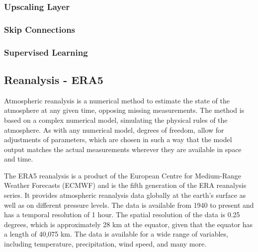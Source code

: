 \subsubsection*{Upscaling Layer}

\subsubsection*{Skip Connections}

\subsubsection*{Supervised Learning}

\subsection{Reanalysis - ERA5}

Atmospheric reanalysis is a numerical method to estimate the state of the atmosphere at any given time, opposing missing measurements. The method is based on a complex numerical model, simulating the physical rules of the atmosphere. As with any numerical model, degrees of freedom, allow for adjustments of parameters, which are chosen in such a way that the model output matches the actual measurements wherever they are available in space and time.

The ERA5 reanalysis is a product of the European Centre for Medium-Range Weather Forecasts (ECMWF) and is the fifth generation of the ERA reanalysis series. It provides atmospheric reanalysis data globally at the earth's surface as well as on different pressure levels. The data is available from 1940 to present and has a temporal resolution of 1 hour. The spatial resolution of the data is 0.25 degrees, which is approximately 28 km at the equator, given that the equator has a length of 40,075 km. The data is available for a wide range of variables, including temperature, precipitation, wind speed, and many more. 